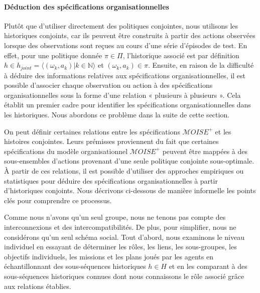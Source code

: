 


\paragraph{\textbf{Déduction des spécifications organisationnelles}}

Plutôt que d'utiliser directement des politiques conjointes, nous utilisons les historiques conjoints, car ils peuvent être construits à partir des actions observées lorsque des observations sont reçues au cours d'une série d'épisodes de test. En effet, pour une politique donnée $\pi \in \Pi$, l'historique associé est par définition $h \in h_{joint} = \langle(\omega_k,a_k) | k \in \mathbb{N}\rangle$ et $(\omega_k,a_k) \in \pi$.
Ensuite, en raison de la difficulté à déduire des informations relatives aux spécifications organisationnelles, il est possible d'associer chaque observation ou action à des spécifications organisationnelles sous la forme d'une relation « plusieurs à plusieurs ». Cela établit un premier cadre pour identifier les spécifications organisationnelles dans les historiques. Nous abordons ce problème dans la suite de cette section.

On peut définir certaines relations entre les spécifications $\mathcal{M}OISE^+$ et les histoires conjointes. Leurs prémisses proviennent du fait que certaines spécifications du modèle organisationnel $\mathcal{M}OISE^+$ peuvent être mappées à des sous-ensembles d'actions provenant d'une seule politique conjointe sous-optimale.
À partir de ces relations, il est possible d'utiliser des approches empiriques ou statistiques pour déduire des spécifications organisationnelles à partir d'historiques conjoints. Nous décrivons ci-dessous de manière informelle les points clés pour comprendre ce processus.

Comme nous n'avons qu'un seul groupe, nous ne tenons pas compte des interconnexions et des intercompatibilités. De plus, pour simplifier, nous ne considérons qu'un seul schéma social.
Tout d'abord, nous examinons le niveau individuel en essayant de déterminer les rôles, les liens, les sous-groupes, les objectifs individuels, les missions et les plans joués par les agents en échantillonnant des sous-séquences historiques $h \in H$ et en les comparant à des sous-séquences historiques connues dont nous connaissons le rôle associé grâce aux relations établies.

